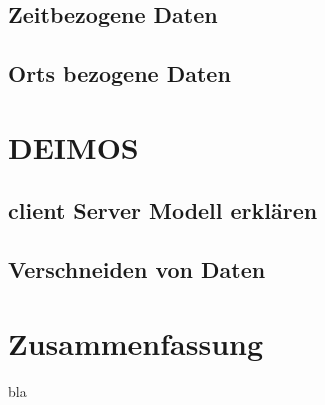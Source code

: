 \documentclass[10pt,conference,compsocconf]{IEEEtran}
\begin{document}
\subsection{Zeitbezogene Daten}

\subsection{Orts bezogene Daten}


\section{DEIMOS}

\subsection{client Server Modell erklären}
%

\subsection{Verschneiden von Daten}


\section{Zusammenfassung}
bla\cite{mariusz}






\end{document}

